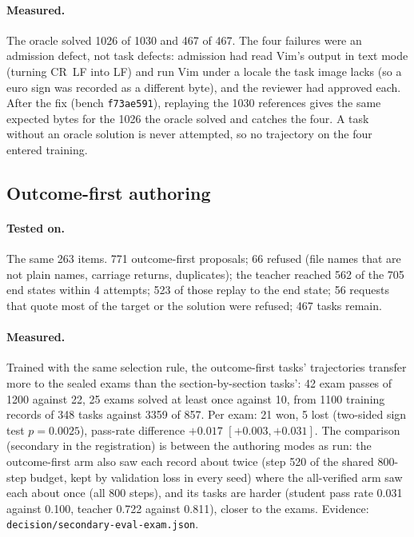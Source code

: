 \paragraph{Measured.} The oracle solved 1026 of 1030 and 467 of 467. The four failures were an admission defect, not task
defects: admission had read Vim's output in text mode (turning CR~LF into LF) and run Vim under a locale the task image lacks
(so a euro sign was recorded as a different byte), and the reviewer had approved each. After the fix (bench \texttt{f73ae591}),
replaying the 1030 references gives the same expected bytes for the 1026 the oracle solved and catches the four. A task
without an oracle solution is never attempted, so no trajectory on the four entered training.

\subsection{Outcome-first authoring}\label{sec:r-outcome}

\paragraph{Tested on.} The same 263 items. 771 outcome-first proposals; 66 refused (file names that are not plain names,
carriage returns, duplicates); the teacher reached 562 of the 705 end states within 4 attempts; 523 of those replay to the end
state; 56 requests that quote most of the target or the solution were refused; 467 tasks remain.

\paragraph{Measured.} Trained with the same selection rule, the outcome-first tasks' trajectories transfer more to the sealed
exams than the section-by-section tasks': 42 exam passes of 1200 against 22, 25 exams solved at least once against 10, from
1100 training records of 348 tasks against 3359 of 857. Per exam: 21 won, 5 lost (two-sided sign test $p=0.0025$), pass-rate
difference $+0.017$ $[+0.003, +0.031]$. The comparison (secondary in the registration) is between the authoring modes as run: the
outcome-first arm also saw each record about twice (step 520 of the shared 800-step budget, kept by validation loss in every
seed) where the all-verified arm saw each about once (all 800 steps), and its tasks are harder (student pass rate 0.031
against 0.100, teacher 0.722 against 0.811), closer to the exams.
Evidence: \nolinkurl{decision/secondary-eval-exam.json}.

